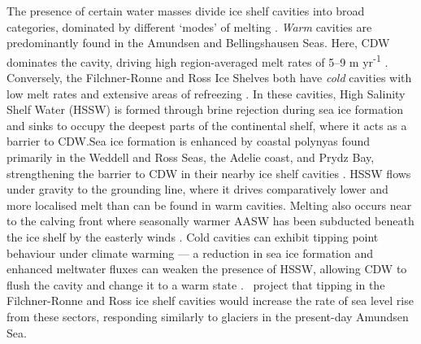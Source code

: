 The presence of certain water masses divide ice shelf cavities into broad categories, dominated by different `modes' of melting \citep{wangMultiscaleOceanicHeat2023}. \textit{Warm} cavities are predominantly found in the Amundsen and Bellingshausen Seas. Here, CDW dominates the cavity, driving high region-averaged melt rates of 5--9 m yr\textsuperscript{-1} \citep{adusumilliInterannualVariationsMeltwater2020}. Conversely, the Filchner-Ronne and Ross Ice Shelves both have \textit{cold} cavities with low melt rates and extensive areas of refreezing \citep{adusumilliInterannualVariationsMeltwater2020}. In these cavities, High Salinity Shelf Water (HSSW) is formed through brine rejection during sea ice formation and sinks to occupy the deepest parts of the continental shelf, where it acts as a barrier to CDW.\@ Sea ice formation is enhanced by coastal polynyas found primarily in the Weddell and Ross Seas, the Adelie coast, and Prydz Bay, strengthening the barrier to CDW in their nearby ice shelf cavities \citep{silvanoObservingAntarcticBottom2023}. HSSW flows under gravity to the grounding line, where it drives comparatively lower and more localised melt than can be found in warm cavities. Melting also occurs near to the calving front where seasonally warmer AASW has been subducted beneath the ice shelf by the easterly winds \citep{wangMultiscaleOceanicHeat2023}. Cold cavities can exhibit tipping point behaviour under climate warming --- a reduction in sea ice formation and enhanced meltwater fluxes can weaken the presence of HSSW, allowing CDW to flush the cavity and change it to a warm state \citep{hellmerTwentyfirstcenturyWarmingLarge2012,hellmerFateSouthernWeddell2017,hoffmanIceshelfFreshwaterTriggers2024}.~\cite{hillOceanWarmingTrigger2024} project that tipping in the Filchner-Ronne and Ross ice shelf cavities would increase the rate of sea level rise from these sectors, responding similarly to glaciers in the present-day Amundsen Sea.

